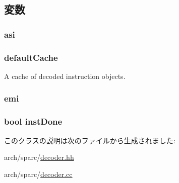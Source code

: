\subsection{変数}
\hypertarget{classSparcISA_1_1Decoder_a68b5e09d28d72c00580cac530947a376}{
\subsubsection[{asi}]{ {\bf asi}}}
\label{classSparcISA_1_1Decoder_a68b5e09d28d72c00580cac530947a376}
\hypertarget{classSparcISA_1_1Decoder_a8800313f93afe356e1177866068cc8d6}{
\subsubsection[{defaultCache}]{ {\bf defaultCache}}}
\label{classSparcISA_1_1Decoder_a8800313f93afe356e1177866068cc8d6}


A cache of decoded instruction objects. \hypertarget{classSparcISA_1_1Decoder_abf211faf305b89c9093b00b6b82b0bd1}{
\subsubsection[{emi}]{ {\bf emi}}}
\label{classSparcISA_1_1Decoder_abf211faf305b89c9093b00b6b82b0bd1}
\hypertarget{classSparcISA_1_1Decoder_a37c5d55785204b8fd00a8ebf62e1fc33}{
\subsubsection[{instDone}]{\setlength{\rightskip}{0pt plus 5cm}bool {\bf instDone}}}
\label{classSparcISA_1_1Decoder_a37c5d55785204b8fd00a8ebf62e1fc33}


このクラスの説明は次のファイルから生成されました:\begin{DoxyCompactItemize}
\item 
arch/sparc/\hyperlink{sparc_2decoder_8hh}{decoder.hh}\item 
arch/sparc/\hyperlink{sparc_2decoder_8cc}{decoder.cc}\end{DoxyCompactItemize}
